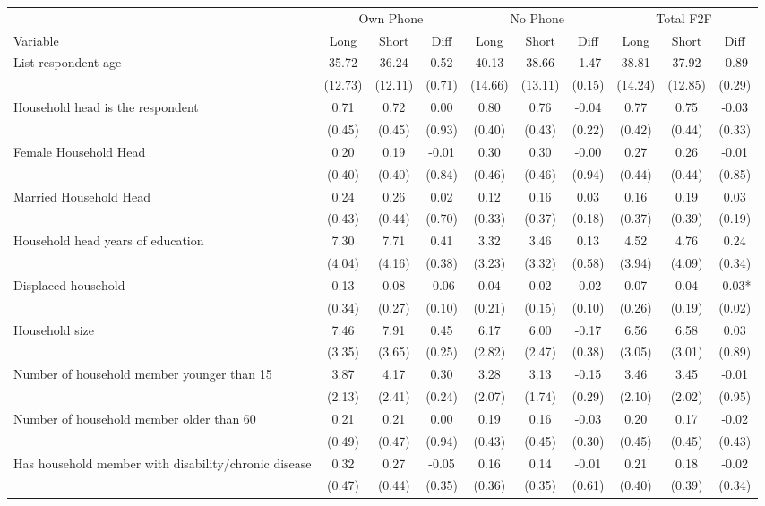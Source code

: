 \begin{tabular}{l*{9}c}
\hline\hline
 & \multicolumn{3}{c}{Own Phone} & \multicolumn{3}{c}{No Phone} & \multicolumn{3}{c}{Total F2F}\\ 
Variable & Long & Short & Diff & Long & Short & Diff & Long & Short & Diff \\
\hline
List respondent age&35.72&36.24&0.52&40.13&38.66&-1.47&38.81&37.92&-0.89\\
&(12.73)&(12.11)&(0.71)&(14.66)&(13.11)&(0.15)&(14.24)&(12.85)&(0.29)\\
Household head is the respondent&0.71&0.72&0.00&0.80&0.76&-0.04&0.77&0.75&-0.03\\
&(0.45)&(0.45)&(0.93)&(0.40)&(0.43)&(0.22)&(0.42)&(0.44)&(0.33)\\
Female Household Head&0.20&0.19&-0.01&0.30&0.30&-0.00&0.27&0.26&-0.01\\
&(0.40)&(0.40)&(0.84)&(0.46)&(0.46)&(0.94)&(0.44)&(0.44)&(0.85)\\
Married Household Head&0.24&0.26&0.02&0.12&0.16&0.03&0.16&0.19&0.03\\
&(0.43)&(0.44)&(0.70)&(0.33)&(0.37)&(0.18)&(0.37)&(0.39)&(0.19)\\
Household head years of education&7.30&7.71&0.41&3.32&3.46&0.13&4.52&4.76&0.24\\
&(4.04)&(4.16)&(0.38)&(3.23)&(3.32)&(0.58)&(3.94)&(4.09)&(0.34)\\
Displaced household&0.13&0.08&-0.06&0.04&0.02&-0.02&0.07&0.04&-0.03*\\
&(0.34)&(0.27)&(0.10)&(0.21)&(0.15)&(0.10)&(0.26)&(0.19)&(0.02)\\
Household size&7.46&7.91&0.45&6.17&6.00&-0.17&6.56&6.58&0.03\\
&(3.35)&(3.65)&(0.25)&(2.82)&(2.47)&(0.38)&(3.05)&(3.01)&(0.89)\\
Number of household member younger than 15&3.87&4.17&0.30&3.28&3.13&-0.15&3.46&3.45&-0.01\\
&(2.13)&(2.41)&(0.24)&(2.07)&(1.74)&(0.29)&(2.10)&(2.02)&(0.95)\\
Number of household member older than 60&0.21&0.21&0.00&0.19&0.16&-0.03&0.20&0.17&-0.02\\
&(0.49)&(0.47)&(0.94)&(0.43)&(0.45)&(0.30)&(0.45)&(0.45)&(0.43)\\
Has household member with disability/chronic disease&0.32&0.27&-0.05&0.16&0.14&-0.01&0.21&0.18&-0.02\\
&(0.47)&(0.44)&(0.35)&(0.36)&(0.35)&(0.61)&(0.40)&(0.39)&(0.34)\\

\end{tabular}
